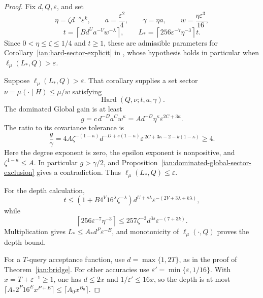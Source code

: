 \begin{proof}
Fix \(d,Q,\varepsilon\), and set
\[
 \eta=\zeta d^{-s}\varepsilon^k,\qquad
 a=\frac{\varepsilon^2}{4},\qquad
 \gamma=\eta a,\qquad
 w=\frac{\eta\varepsilon^3}{16},
\]
\[
 t=\left\lceil B d^U a^{-V}w^{-\lambda}\right\rceil,
 \qquad
 L_*=\left\lceil256\varepsilon^{-7}\eta^{-3}\right\rceil t.
\]
Since \(0<\eta\le\zeta\le1/4\) and \(t\ge1\), these are admissible
parameters for Corollary~\ref{ian:hard-sector-explicit} in
, whose hypothesis
holds in particular when \(\ell_\mu(L_*,Q)>\varepsilon\).

Suppose \(\ell_\mu(L_*,Q)>\varepsilon\). That corollary supplies a set
sector \(\nu=\mu(\cdot\mid H)\le\mu/w\) satisfying
\[
 \operatorname{Hard}(Q,\nu;t,a,\gamma).
\]
The dominated Global gain is at least
\[
 g=c\,d^{-D}a^Cw^\kappa
   =A d^{-D}\eta^\kappa\varepsilon^{2C+3\kappa}.
\]
The ratio to its covariance tolerance is
\[
 \frac g\gamma
 =
 4A \zeta^{-(1-\kappa)}
 d^{-D+s(1-\kappa)}
 \varepsilon^{\,2C+3\kappa-2-k(1-\kappa)}
 \ge4.
\]
Here the degree exponent is zero, the epsilon exponent is
nonpositive, and \(\zeta^{1-\kappa}\le A\). In particular
\(g>\gamma/2\), and
Proposition~\ref{ian:dominated-global-sector-exclusion} gives a
contradiction. Thus \(\ell_\mu(L_*,Q)\le\varepsilon\).

For the depth calculation,
\[
 t\le
 \left(1+B4^V16^\lambda \zeta^{-\lambda}\right)
 d^{U+s\lambda}
 \varepsilon^{-(2V+3\lambda+k\lambda)},
\]
while
\[
 \left\lceil256\varepsilon^{-7}\eta^{-3}\right\rceil
 \le257\zeta^{-3}d^{3s}\varepsilon^{-(7+3k)}.
\]
Multiplication gives \(L_*\le A_*d^P\varepsilon^{-E}\), and monotonicity of
\(\ell_\mu(\cdot,Q)\) proves the depth bound.

For a \(T\)-query acceptance function, use
\(d=\max\{1,2T\}\), as in the proof of Theorem~\ref{ian:bridge}.
For other accuracies use
\(\varepsilon'=\min\{\varepsilon,1/16\}\). With
\(x=T+\varepsilon^{-1}\ge1\), one has \(d\le2x\) and
\(1/\varepsilon'\le16x\), so the depth is at most
\(\lceil A_*2^P16^Ex^{P+E}\rceil\le\lceil A_0x^{B_0}\rceil\).
\end{proof}


